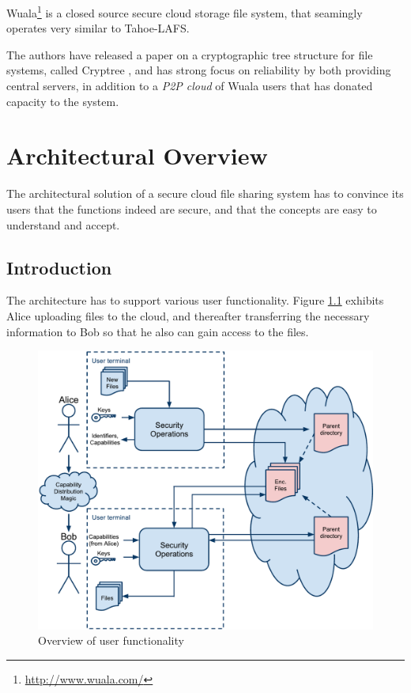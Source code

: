 \documentclass[pdftex,english,10pt,b5paper,twoside]{book}
\begin{document}
Wuala\footnote{\url{http://www.wuala.com/}} is a closed source secure cloud
storage file system, that seamingly operates very similar to Tahoe-\ac{LAFS}.

The authors have released a paper on a cryptographic tree structure for file
systems, called Cryptree \cite{cryptree}, and has strong focus on reliability
by both providing central servers, in addition to a \emph{P2P cloud} of Wuala
users that has donated capacity to the system. 

\chapter{Architectural Overview}
\label{chap:AS}

The architectural solution of a secure cloud file sharing system has to convince
its users that the functions indeed are secure, and that the concepts are easy
to understand and accept.

\section{Introduction}

The architecture has to support various user functionality. Figure
\ref{fig:AS:overview} exhibits Alice uploading files to the cloud, and
thereafter transferring the necessary information to Bob so that he also can
gain access to the files.

\begin{figure}[h!]
    \centering
    \includegraphics[width=\columnwidth]{ArchitectureOverview.pdf}
    \caption{Overview of user functionality}
    \label{fig:AS:overview}
\end{figure}
\end{document}
